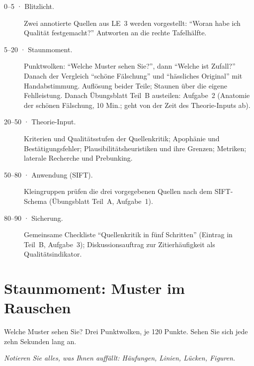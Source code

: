 \begin{ablauf}
\begin{description}
\item[0--5 · Blitzlicht.] Zwei annotierte Quellen aus LE~3 werden
  vorgestellt: \enquote{Woran habe ich Qualität festgemacht?} Antworten an
  die rechte Tafelhälfte.
\item[5--20 · Staunmoment.] Punktwolken: \enquote{Welche Muster sehen
  Sie?}, dann \enquote{Welche ist Zufall?} Danach der Vergleich
  \enquote{schöne Fälschung} und \enquote{hässliches Original} mit
  Handabstimmung. Auflösung beider Teile; Staunen über die eigene
  Fehlleistung. Danach Übungsblatt Teil~B austeilen: Aufgabe~2
  (Anatomie der schönen Fälschung, 10 Min.; geht von der Zeit des
  Theorie-Inputs ab).
\item[20--50 · Theorie-Input.] Kriterien und Qualitätsstufen der
  Quellenkritik; Apophänie und Bestätigungsfehler; Plausibilitätsheuristiken
  und ihre Grenzen; Metriken; laterale Recherche und Prebunking.
\item[50--80 · Anwendung (SIFT).] Kleingruppen prüfen die drei
  vorgegebenen Quellen nach dem SIFT-Schema (Übungsblatt Teil~A, Aufgabe~1).
\item[80--90 · Sicherung.] Gemeinsame Checkliste \enquote{Quellenkritik in
  fünf Schritten} (Eintrag in Teil~B, Aufgabe~3); Diskussionsauftrag zur
  Zitierhäufigkeit als Qualitätsindikator.
\end{description}
\end{ablauf}

\section{Staunmoment: Muster im Rauschen}
\begin{staunbox}{Welche Muster sehen Sie?}
Drei Punktwolken, je 120 Punkte. Sehen Sie sich jede zehn Sekunden lang an.

\emph{Notieren Sie alles, was Ihnen auffällt: Häufungen, Linien, Lücken,
Figuren.}
\end{staunbox}
\os{\newpage}

